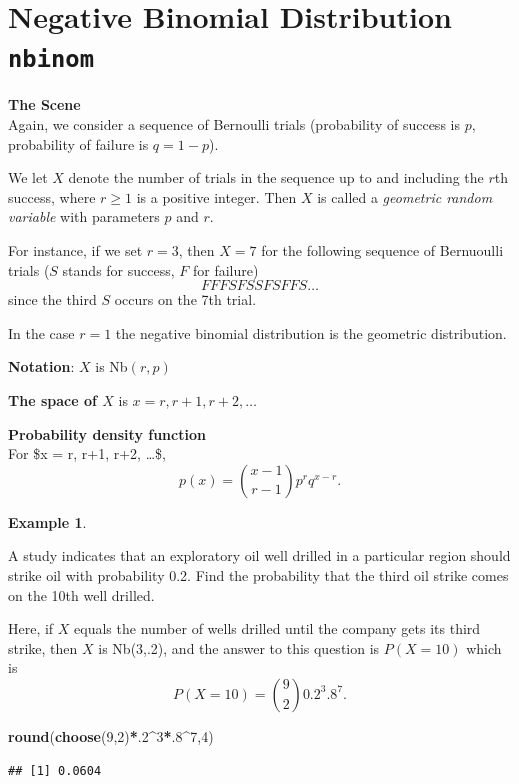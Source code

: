 \documentclass[
]{book}
\newenvironment{Shaded}{\begin{snugshade}}{\end{snugshade}}
\newcommand{\DecValTok}[1]{\textcolor[rgb]{0.00,0.00,0.81}{#1}}
\newcommand{\FunctionTok}[1]{\textcolor[rgb]{0.13,0.29,0.53}{\textbf{#1}}}
\newcommand{\NormalTok}[1]{#1}
\newcommand{\SpecialCharTok}[1]{\textcolor[rgb]{0.81,0.36,0.00}{\textbf{#1}}}
\theoremstyle{definition}
\theoremstyle{definition}
\newtheorem{example}{Example}[chapter]
\theoremstyle{definition}
\theoremstyle{definition}
\theoremstyle{remark}
\begin{document}
\section{\texorpdfstring{Negative Binomial Distribution \texttt{nbinom}}{Negative Binomial Distribution nbinom}}\label{negative-binomial-distribution-nbinom}

\textbf{The Scene}\\
Again, we consider a sequence of Bernoulli trials (probability of success is \(p\), probability of failure is \(q = 1-p\)).

We let \(X\) denote the number of trials in the sequence up to and including the \(r\)th success, where \(r \geq 1\) is a positive integer. Then \(X\) is called a \emph{geometric random variable} with parameters \(p\) and \(r\).

For instance, if we set \(r = 3\), then \(X = 7\) for the following sequence of Bernuoulli trials (\(S\) stands for success, \(F\) for failure)
\[F F F S F S S F S F F S \ldots \]
since the third \(S\) occurs on the 7th trial.

In the case \(r = 1\) the negative binomial distribution is the geometric distribution.

\textbf{Notation}: \(X\) is Nb\((r,p)\)

\textbf{The space of \(X\)} is \(x = r, r+1, r+2, \ldots\)

\textbf{Probability density function}\\
For \$x = r, r+1, r+2, \ldots \$, \[p(x)= \binom{x-1}{r-1}p^{r}q^{x-r}.\]

\begin{example}
\protect\hypertarget{exm:drill-oil-negbinom-R}{}\label{exm:drill-oil-negbinom-R}

A study indicates that an exploratory oil well drilled in a particular region should strike oil with probability 0.2. Find the probability that the third oil strike comes on the 10th well drilled.

Here, if \(X\) equals the number of wells drilled until the company gets its third strike, then \(X\) is Nb(3,.2), and the answer to this question is \(P(X=10)\) which is \[P(X=10)=\binom{9}{2}0.2^{3}.8^{7}.\]

\begin{Shaded}
\begin{Highlighting}[]
\FunctionTok{round}\NormalTok{(}\FunctionTok{choose}\NormalTok{(}\DecValTok{9}\NormalTok{,}\DecValTok{2}\NormalTok{)}\SpecialCharTok{*}\NormalTok{.}\DecValTok{2}\SpecialCharTok{\^{}}\DecValTok{3}\SpecialCharTok{*}\NormalTok{.}\DecValTok{8}\SpecialCharTok{\^{}}\DecValTok{7}\NormalTok{,}\DecValTok{4}\NormalTok{)}
\end{Highlighting}
\end{Shaded}

\begin{verbatim}
## [1] 0.0604
\end{verbatim}

\end{example}
\end{document}
